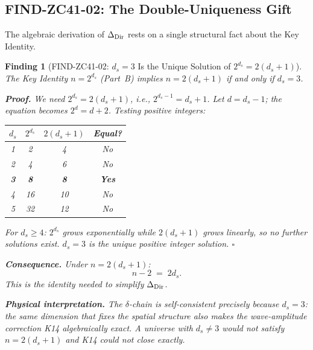 \documentclass[12pt, a4paper]{article}
\newtheorem{finding}{Finding}[section]
\begin{document}
\subsection{FIND-ZC41-02: The Double-Uniqueness Gift}
\label{sec:gift}

The algebraic derivation of $\Delta_{\rm Dir}$ rests on a single
structural fact about the Key Identity.

\begin{finding}[FIND-ZC41-02: $d_s = 3$ Is the Unique Solution
  of $2^{d_s} = 2(d_s+1)$]
\label{find:gift}
The Key Identity $n = 2^{d_s}$ (Part~B) implies $n = 2(d_s+1)$
\emph{if and only if} $d_s = 3$.

\medskip
\noindent\textbf{Proof.}
We need $2^{d_s} = 2(d_s+1)$, i.e., $2^{d_s-1} = d_s+1$.
Let $d = d_s - 1$; the equation becomes $2^d = d + 2$.
Testing positive integers:
\begin{center}
\renewcommand{\arraystretch}{1.25}
\small
\begin{tabular}{cccc}
\toprule
$d_s$ & $2^{d_s}$ & $2(d_s+1)$ & Equal? \\
\midrule
1 & 2  & 4  & No  \\
2 & 4  & 6  & No  \\
\textbf{3} & \textbf{8}  & \textbf{8}  & \textbf{Yes} \\
4 & 16 & 10 & No  \\
5 & 32 & 12 & No  \\
\bottomrule
\end{tabular}
\end{center}
For $d_s \geq 4$: $2^{d_s}$ grows exponentially while $2(d_s+1)$
grows linearly, so no further solutions exist.
$d_s = 3$ is the unique positive integer solution.
\hfill$\square$

\medskip
\noindent\textbf{Consequence.}
Under $n = 2(d_s+1)$:
\[
  n - 2 \;=\; 2d_s.
  \tag{Key-Cor}
\]
This is the identity needed to simplify $\Delta_{\rm Dir}$.

\medskip
\noindent\textbf{Physical interpretation.}
The $\delta$-chain is self-consistent precisely because
$d_s = 3$: the same dimension that fixes the spatial structure
also makes the wave-amplitude correction K14 algebraically exact.
A universe with $d_s \neq 3$ would not satisfy
$n = 2(d_s+1)$ and K14 could not close exactly.
\end{finding}
\end{document}
